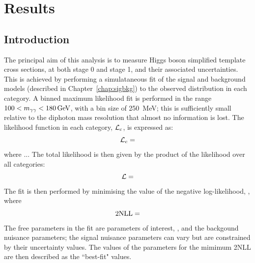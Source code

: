 \chapter{Results}
\label{chap:results}

\section{Introduction}
The principal aim of this analysis is to measure Higgs boson simplified template cross sections, 
at both stage 0 and stage 1, and their associated uncertainties.
This is achieved by performing a simulataneous fit of the signal and background models 
(described in Chapter~\ref{chap:sigbkg}) to the observed \mgg distribution in each category.
A binned maximum likelihood fit is performed in the range $100 < m_{\gamma\gamma} < \SI{180}{GeV}$, 
with a bin size of \SI{250}{MeV};
this is sufficiently small relative to the diphoton mass resolution that almost no information is lost.
The likelihood function in each category, $\mathcal{L}_c$, is expressed as:
\begin{equation}
\mathcal{L}_c = 
\end{equation}
where ...
The total likelihood \Like is then given by the product of the likelihood over all categories:
\begin{equation}
\mathcal{L} = 
\end{equation}
The fit is then performed by minimising the value of the negative log-likelihood, \NLL, where
\begin{equation}
2\textrm{NLL} = 
\end{equation}
The free parameters in the fit are parameters of interest, \mH, and the backgound nuisance parameters;
the signal nuisance parameters can vary but are constrained by their uncertainty values.
The values of the parameters for the mimimum 2NLL are then described as the ``best-fit" values.

